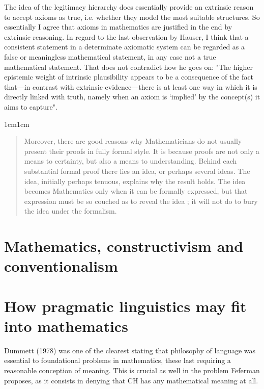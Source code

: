 \documentclass[11pt,a4paper]{book}
\theoremstyle{plain}
\begin{document}
The idea of the legitimacy hierarchy does essentially provide an extrinsic reason to accept axioms as true, i.e. whether they model the most suitable structures. So essentially I agree that axioms in mathematics are justified in the end by extrinsic reasoning. In regard to the last observation by Hauser, I think that a consistent statement in a determinate axiomatic system can be regarded as a false or meaningless mathematical statement, in any case not a true mathematical statement. That does not contradict how he goes on: "The higher epistemic weight of intrinsic plausibility appears to be a consequence of the fact that—in contrast with extrinsic evidence—there is at least one way in which it is directly linked with truth, namely when an axiom is ‘implied’ by the concept(s) it aims to capture". 


\begin{adjustwidth}{1cm}{1cm}
  \small
  \begin{quote}
Moreover, there are good reasons why Mathematicians do not usually present their proofs in fully formal style. It is because proofs are not only a means to certainty, but also a means to understanding. Behind each substantial formal proof there lies an idea, or perhaps several ideas. The idea, initially perhaps tenuous, explains why the result holds. The idea becomes Mathematics only when it can be formally expressed, but that expression must be so couched as to reveal the idea ; it will not do to bury the idea under the formalism. \textcite[378]{maclane1986mathematics}
  \end{quote}
\end{adjustwidth}


\section{Mathematics, constructivism and conventionalism}


\section{How pragmatic linguistics may fit into mathematics}

Dummett (1978) was one of the clearest stating that philosophy of language was essential to foundational problems in mathematics, these last requiring a reasonable conception of meaning. This is crucial as well in the problem Feferman proposes, as it consists in denying that CH has any mathematical meaning at all. 
\end{document}
